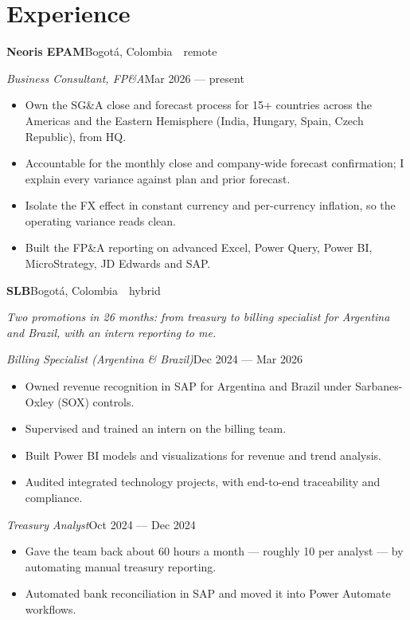 \documentclass[a4paper,10pt]{article}
\newcommand{\headline}[2]{\needspace{3\baselineskip}\textbf{\color{ink}#1}\hfill{\small #2}\par}
\newcommand{\subline}[2]{\textit{#1}\hfill{\small #2}\par}
\begin{document}
\section*{Experience}
\headline{Neoris EPAM}{Bogotá, Colombia \,\textperiodcentered\, remote}
\vspace{1pt}
\subline{Business Consultant, FP\&A}{Mar 2026 --- present}
\begin{itemize}[leftmargin=1.1em, itemsep=0pt, topsep=1pt, parsep=0pt]
  \item Own the SG\&A close and forecast process for 15+ countries across the Americas and the Eastern Hemisphere (India, Hungary, Spain, Czech Republic), from HQ.
  \item Accountable for the monthly close and company-wide forecast confirmation; I explain every variance against plan and prior forecast.
  \item Isolate the FX effect in constant currency and per-currency inflation, so the operating variance reads clean.
  \item Built the FP\&A reporting on advanced Excel, Power Query, Power BI, MicroStrategy, JD Edwards and SAP.
\end{itemize}
\vspace{4pt}
\headline{SLB}{Bogotá, Colombia \,\textperiodcentered\, hybrid}
{\small\itshape\color{cold} Two promotions in 26 months: from treasury to billing specialist for Argentina and Brazil, with an intern reporting to me.}\par
\vspace{1pt}
\subline{Billing Specialist (Argentina \& Brazil)}{Dec 2024 --- Mar 2026}
\begin{itemize}[leftmargin=1.1em, itemsep=0pt, topsep=1pt, parsep=0pt]
  \item Owned revenue recognition in SAP for Argentina and Brazil under Sarbanes-Oxley (SOX) controls.
  \item Supervised and trained an intern on the billing team.
  \item Built Power BI models and visualizations for revenue and trend analysis.
  \item Audited integrated technology projects, with end-to-end traceability and compliance.
\end{itemize}
\subline{Treasury Analyst}{Oct 2024 --- Dec 2024}
\begin{itemize}[leftmargin=1.1em, itemsep=0pt, topsep=1pt, parsep=0pt]
  \item Gave the team back about 60 hours a month --- roughly 10 per analyst --- by automating manual treasury reporting.
  \item Automated bank reconciliation in SAP and moved it into Power Automate workflows.
\end{itemize}
\end{document}

